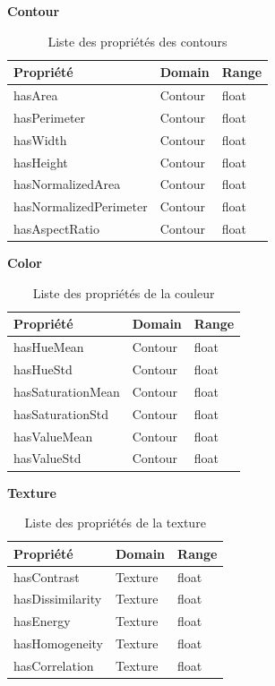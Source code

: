 \documentclass{article}
\begin{document}
	\FloatBarrier
	
	\noindent\textbf{Contour}
	\begin{table}[H]
		\centering
		\begin{tabular}{|p{5cm}|p{5cm}|p{5cm}|}
			\hline
			\textbf{Propriété} & \textbf{Domain} & \textbf{Range} \\
			\hline
			hasArea & Contour & float \\
			\hline
			hasPerimeter & Contour & float \\
			\hline
			hasWidth & Contour & float \\
			\hline
			hasHeight & Contour & float \\
			\hline
			hasNormalizedArea & Contour & float \\
			\hline
			hasNormalizedPerimeter & Contour & float \\
			\hline
			hasAspectRatio & Contour & float \\
			\hline
		\end{tabular}
		\caption{Liste des propriétés des contours}
	\end{table}
	
	\FloatBarrier
	
	\noindent\textbf{Color}
	\begin{table}[H]
		\centering
		\begin{tabular}{|p{5cm}|p{5cm}|p{5cm}|}
			\hline
			\textbf{Propriété} & \textbf{Domain} & \textbf{Range} \\
			\hline
			hasHueMean & Contour & float \\
			\hline
			hasHueStd & Contour & float \\
			\hline
			hasSaturationMean & Contour & float \\
			\hline
			hasSaturationStd & Contour & float \\
			\hline
			hasValueMean & Contour & float \\
			\hline
			hasValueStd & Contour & float \\
			\hline
		\end{tabular}
		\caption{Liste des propriétés de la couleur}
	\end{table}
	
	\FloatBarrier
	
	\noindent\textbf{Texture}
	\begin{table}[H]
		\centering
		\begin{tabular}{|p{5cm}|p{5cm}|p{5cm}|}
			\hline
			\textbf{Propriété} & \textbf{Domain} & \textbf{Range} \\
			\hline
			hasContrast & Texture & float \\
			\hline
			hasDissimilarity & Texture & float \\
			\hline
			hasEnergy & Texture & float \\
			\hline
			hasHomogeneity & Texture & float \\
			\hline
			hasCorrelation & Texture & float \\
			\hline
		\end{tabular}
		\caption{Liste des propriétés de la texture}
	\end{table}
	
\end{document}
